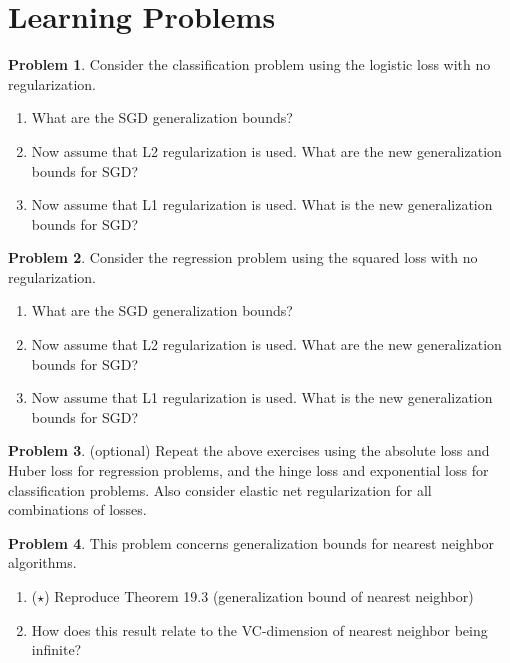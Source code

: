 \documentclass[10pt]{article}
\theoremstyle{definition}
\newtheorem{problem}{Problem}
\begin{document}
\section{Learning Problems}
\begin{problem}
    Consider the classification problem using the logistic loss with no regularization.
    \begin{enumerate}
        \item 
            What are the SGD generalization bounds?
            \newpage
        \item 
            Now assume that L2 regularization is used.
            What are the new generalization bounds for SGD?
            \newpage
        \item 
            Now assume that L1 regularization is used.
            What is the new generalization bounds for SGD?
    \end{enumerate}
\end{problem}

\newpage
\begin{problem}
    Consider the regression problem using the squared loss with no regularization.
    \begin{enumerate}
        \item 
            What are the SGD generalization bounds?
            \newpage
        \item 
            Now assume that L2 regularization is used.
            What are the new generalization bounds for SGD?
            \newpage
        \item 
            Now assume that L1 regularization is used.
            What is the new generalization bounds for SGD?
    \end{enumerate}
\end{problem}

\newpage
\begin{problem}
    (optional) 
    Repeat the above exercises using the absolute loss and Huber loss for regression problems, and the hinge loss and exponential loss for classification problems.
    Also consider elastic net regularization for all combinations of losses.
\end{problem}

\newpage
\begin{problem}
    This problem concerns generalization bounds for nearest neighbor algorithms.
    \begin{enumerate}
        \item ($\star$) Reproduce Theorem 19.3 (generalization bound of nearest neighbor)
        \vspace{4.5in}
        \item How does this result relate to the VC-dimension of nearest neighbor being infinite?
    \end{enumerate}
\end{problem}
\end{document}
